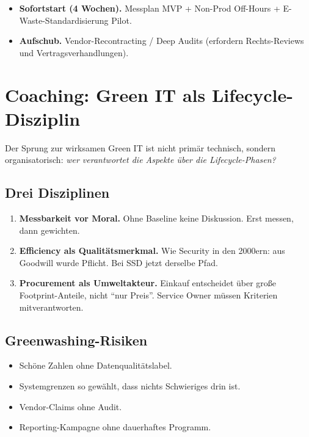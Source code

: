 \documentclass[11pt,a4paper,oneside]{article}
\begin{document}
\begin{itemize}
  \item \textbf{Sofortstart (4 Wochen).} Messplan MVP + Non-Prod Off-Hours + E-Waste-Standardisierung Pilot.
  \item \textbf{Aufschub.} Vendor-Recontracting / Deep Audits (erfordern Rechts-Reviews und Vertragsverhandlungen).
\end{itemize}

\section{Coaching: Green IT als Lifecycle-Disziplin}

Der Sprung zur wirksamen Green IT ist nicht primär technisch, sondern organisatorisch: \emph{wer verantwortet die Aspekte über die Lifecycle-Phasen?}

\subsection{Drei Disziplinen}

\begin{enumerate}
  \item \textbf{Messbarkeit vor Moral.} Ohne Baseline keine Diskussion. Erst messen, dann gewichten.
  \item \textbf{Efficiency als Qualitätsmerkmal.} Wie Security in den 2000ern: aus Goodwill wurde Pflicht. Bei SSD jetzt derselbe Pfad.
  \item \textbf{Procurement als Umweltakteur.} Einkauf entscheidet über große Footprint-Anteile, nicht ``nur Preis''. Service Owner müssen Kriterien mitverantworten.
\end{enumerate}

\subsection{Greenwashing-Risiken}

\begin{itemize}
  \item Schöne Zahlen ohne Datenqualitätslabel.
  \item Systemgrenzen so gewählt, dass nichts Schwieriges drin ist.
  \item Vendor-Claims ohne Audit.
  \item Reporting-Kampagne ohne dauerhaftes Programm.
\end{itemize}
\end{document}
